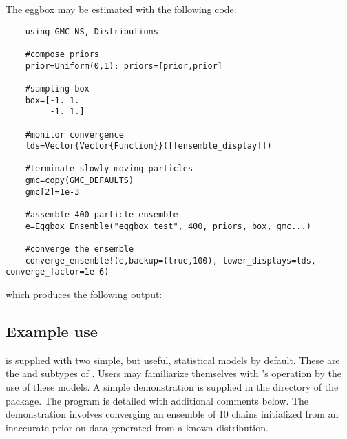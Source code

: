 
The eggbox may be estimated with the following code:

\begin{verbatim}
    using GMC_NS, Distributions

    #compose priors
    prior=Uniform(0,1); priors=[prior,prior]

    #sampling box
    box=[-1. 1.
         -1. 1.]

    #monitor convergence
    lds=Vector{Vector{Function}}([[ensemble_display]])

    #terminate slowly moving particles
    gmc=copy(GMC_DEFAULTS)
    gmc[2]=1e-3

    #assemble 400 particle ensemble
    e=Eggbox_Ensemble("eggbox_test", 400, priors, box, gmc...)

    #converge the ensemble
    converge_ensemble!(e,backup=(true,100), lower_displays=lds, converge_factor=1e-6)
\end{verbatim}

which produces the following output:

\subsection{Example use}
 is supplied with two simple, but useful, statistical models by default. These are the  and  subtypes of . Users may familiarize themselves with 's operation by the use of these models. A simple demonstration is supplied in the  directory of the package. The program is detailed with additional comments below. The demonstration involves converging an ensemble of 10  chains initialized from an inaccurate  prior on data generated from a known  distribution.

